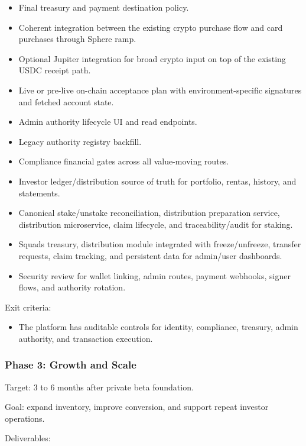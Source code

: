 \documentclass[
  10pt,
  letterpaper,
]{article}
\providecommand{\tightlist}{%
  \setlength{\itemsep}{0pt}\setlength{\parskip}{0pt}}
\begin{document}
\begin{itemize}
\tightlist
\item
  Final treasury and payment destination policy.
\item
  Coherent integration between the existing crypto purchase flow and
  card purchases through Sphere ramp.
\item
  Optional Jupiter integration for broad crypto input on top of the
  existing USDC receipt path.
\item
  Live or pre-live on-chain acceptance plan with environment-specific
  signatures and fetched account state.
\item
  Admin authority lifecycle UI and read endpoints.
\item
  Legacy authority registry backfill.
\item
  Compliance financial gates across all value-moving routes.
\item
  Investor ledger/distribution source of truth for portfolio, rentas,
  history, and statements.
\item
  Canonical stake/unstake reconciliation, distribution preparation
  service, distribution microservice, claim lifecycle, and
  traceability/audit for staking.
\item
  Squads treasury, distribution module integrated with freeze/unfreeze,
  transfer requests, claim tracking, and persistent data for admin/user
  dashboards.
\item
  Security review for wallet linking, admin routes, payment webhooks,
  signer flows, and authority rotation.
\end{itemize}

Exit criteria:

\begin{itemize}
\tightlist
\item
  The platform has auditable controls for identity, compliance,
  treasury, admin authority, and transaction execution.
\end{itemize}

\subsubsection{Phase 3: Growth and
Scale}\label{phase-3-growth-and-scale}

Target: 3 to 6 months after private beta foundation.

Goal: expand inventory, improve conversion, and support repeat investor
operations.

Deliverables:
\end{document}
